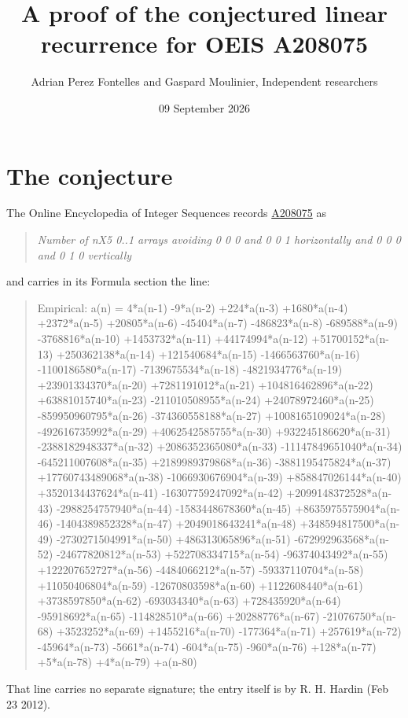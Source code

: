 \documentclass[11pt]{article}
\title{A proof of the conjectured linear recurrence for OEIS A208075}
\author{Adrian Perez Fontelles and Gaspard Moulinier, Independent researchers}
\date{09 September 2026}
\theoremstyle{definition}
\begin{document}
\maketitle
\section{The conjecture}

The Online Encyclopedia of Integer Sequences records \href{https://oeis.org/A208075}{A208075} as

\begin{quote}\itshape Number of nX5 0..1 arrays avoiding 0 0 0 and 0 0 1 horizontally and 0 0 0 and 0 1 0 vertically\end{quote}

and carries in its Formula section the line:

\begin{quote}\ttfamily Empirical: a(n) = 4*a(n-1) -9*a(n-2) +224*a(n-3) +1680*a(n-4) +2372*a(n-5) +20805*a(n-6) -45404*a(n-7) -486823*a(n-8) -689588*a(n-9) -3768816*a(n-10) +1453732*a(n-11) +44174994*a(n-12) +51700152*a(n-13) +250362138*a(n-14) +121540684*a(n-15) -1466563760*a(n-16) -1100186580*a(n-17) -7139675534*a(n-18) -4821934776*a(n-19) +23901334370*a(n-20) +7281191012*a(n-21) +104816462896*a(n-22) +63881015740*a(n-23) -211010508955*a(n-24) +24078972460*a(n-25) -859950960795*a(n-26) -374360558188*a(n-27) +1008165109024*a(n-28) -492616735992*a(n-29) +4062542585755*a(n-30) +932245186620*a(n-31) -2388182948337*a(n-32) +2086352365080*a(n-33) -11147849651040*a(n-34) -645211007608*a(n-35) +2189989379868*a(n-36) -3881195475824*a(n-37) +17760743489068*a(n-38) -1066930676904*a(n-39) +858847026144*a(n-40) +3520134437624*a(n-41) -16307759247092*a(n-42) +2099148372528*a(n-43) -2988254757940*a(n-44) -1583448678360*a(n-45) +8635975575904*a(n-46) -1404389852328*a(n-47) +2049018643241*a(n-48) +348594817500*a(n-49) -2730271504991*a(n-50) +486313065896*a(n-51) -672992963568*a(n-52) -24677820812*a(n-53) +522708334715*a(n-54) -96374043492*a(n-55) +122207652727*a(n-56) -4484066212*a(n-57) -59337110704*a(n-58) +11050406804*a(n-59) -12670803598*a(n-60) +1122608440*a(n-61) +3738597850*a(n-62) -693034340*a(n-63) +728435920*a(n-64) -95918692*a(n-65) -114828510*a(n-66) +20288776*a(n-67) -21076750*a(n-68) +3523252*a(n-69) +1455216*a(n-70) -177364*a(n-71) +257619*a(n-72) -45964*a(n-73) -5661*a(n-74) -604*a(n-75) -960*a(n-76) +128*a(n-77) +5*a(n-78) +4*a(n-79) +a(n-80)\end{quote}

That line carries no separate signature; the entry itself is by R. H. Hardin (Feb 23 2012).
\end{document}
